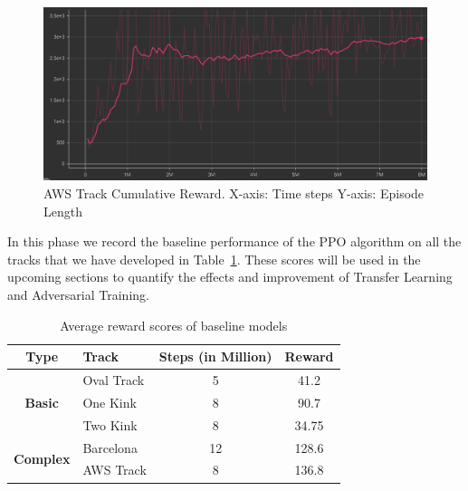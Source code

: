 \begin{figure}[H]
    \centering
    \includegraphics[width=1.0\textwidth]{images/graphs/AWS-EpisodeLength.png}
    \caption{AWS Track Cumulative Reward.  X-axis: Time steps  Y-axis: Episode Length}
    \label{fig:10}
\end{figure}

In this phase we record the baseline performance of the PPO algorithm
on all the tracks that we have developed in
Table~\ref{tab:baseline}. These scores will be used in the upcoming
sections to quantify the effects and improvement of Transfer Learning
and Adversarial Training.

\begin{table}[H]
\centering\begin{tabular}{|c|l|c|c|}
\hline
\textbf{Type}                                         & \textbf{Track} & \textbf{Steps (in Million)} & \textbf{Reward} \\ \hline
\multicolumn{1}{|c|}{\multirow{3}{*}{\textbf{Basic}}} & Oval Track     &  5                           &    41.2             \\ \cline{2-4} 
\multicolumn{1}{|c|}{}                                & One Kink       & 8                            &  90.7               \\ \cline{2-4} 
\multicolumn{1}{|c|}{}                                & Two Kink       & 8                           & 34.75           \\ \hline
\multirow{2}{*}{\textbf{Complex}}                     & Barcelona      & 12                         &   128.6              \\ \cline{2-4} 
                                                      & AWS Track      &        8                     & 136.8                 \\ \hline
\end{tabular}
\caption{Average reward scores of baseline models}
\label{tab:baseline}
\end{table}

